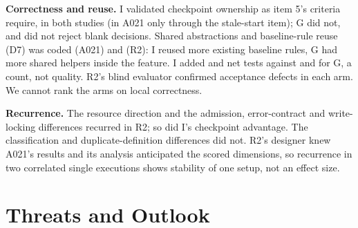 \documentclass[10pt,conference]{IEEEtran}
\newcommand{\G}{G}
\newcommand{\I}{I}
\begin{document}
\textbf{Correctness and reuse.} \I{} validated checkpoint ownership as item 5's criteria require, in both studies (in A021 only through the stale-start item); \G{} did not, and did not reject blank decisions. Shared abstractions and baseline-rule reuse (D7) was coded \ArchDSevenA{} (A021) and \ArchDSevenRtwo{} (R2): \I{} reused more existing baseline rules, \G{} had more shared helpers inside the feature. %
\I{} added \AtestsAddedIndep{} and \RtwoTestsAddedIndep{} net tests against \AtestsAddedGrouped{} and \RtwoTestsAddedGrouped{} for \G, a count, not quality. R2's blind evaluator confirmed \RtwoDefectsGrouped{} acceptance defects in each arm. We cannot rank the arms on local correctness. %



\textbf{Recurrence.} The resource direction and the admission, error-contract and write-locking differences recurred in R2; so did \I's checkpoint advantage. The classification and duplicate-definition differences did not. R2's designer knew A021's results and its analysis anticipated the scored dimensions, so recurrence in two correlated single executions shows stability of one setup, not an effect size. %

\section{Threats and Outlook}
\end{document}
